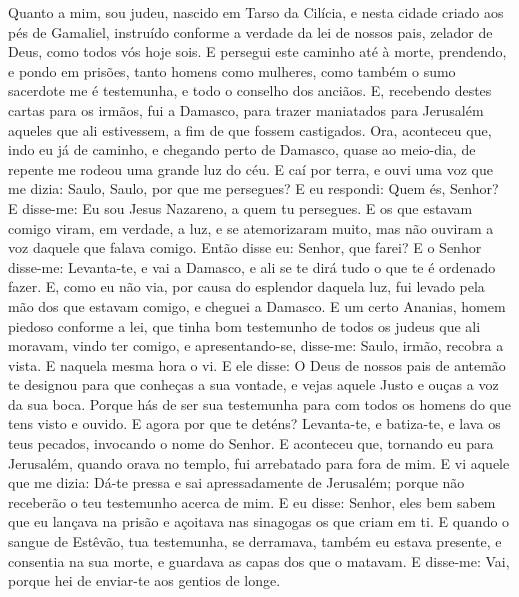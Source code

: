 Quanto a mim, sou judeu, nascido em Tarso da Cilícia, e nesta
cidade criado aos pés de Gamaliel, instruído conforme a verdade da
lei de nossos pais, zelador de Deus, como todos vós hoje sois. E
persegui este caminho até à morte, prendendo, e pondo em prisões,
tanto homens como mulheres, como também o sumo sacerdote me é
testemunha, e todo o conselho dos anciãos. E, recebendo destes
cartas para os irmãos, fui a Damasco, para trazer maniatados para
Jerusalém aqueles que ali estivessem, a fim de que fossem
castigados. Ora, aconteceu que, indo eu já de caminho, e
chegando perto de Damasco, quase ao meio-dia, de repente me rodeou
uma grande luz do céu. E caí por terra, e ouvi uma voz que me
dizia: Saulo, Saulo, por que me persegues? E eu respondi: Quem
és, Senhor? E disse-me: Eu sou Jesus Nazareno, a quem tu persegues.
E os que estavam comigo viram, em verdade, a luz, e se
atemorizaram muito, mas não ouviram a voz daquele que falava comigo.
Então disse eu: Senhor, que farei? E o Senhor disse-me:
Levanta-te, e vai a Damasco, e ali se te dirá tudo o que te é
ordenado fazer. E, como eu não via, por causa do esplendor
daquela luz, fui levado pela mão dos que estavam comigo, e cheguei a
Damasco. E um certo Ananias, homem piedoso conforme a lei,
que tinha bom testemunho de todos os judeus que ali moravam,
vindo ter comigo, e apresentando-se, disse-me: Saulo, irmão,
recobra a vista. E naquela mesma hora o vi. E ele disse: O
Deus de nossos pais de antemão te designou para que conheças a sua
vontade, e vejas aquele Justo e ouças a voz da sua boca.
Porque hás de ser sua testemunha para com todos os homens do
que tens visto e ouvido. E agora por que te deténs?
Levanta-te, e batiza-te, e lava os teus pecados, invocando o nome do
Senhor. E aconteceu que, tornando eu para Jerusalém, quando
orava no templo, fui arrebatado para fora de mim. E vi aquele
que me dizia: Dá-te pressa e sai apressadamente de Jerusalém; porque
não receberão o teu testemunho acerca de mim. E eu disse:
Senhor, eles bem sabem que eu lançava na prisão e açoitava nas
sinagogas os que criam em ti. E quando o sangue de Estêvão,
tua testemunha, se derramava, também eu estava presente, e consentia
na sua morte, e guardava as capas dos que o matavam. E
disse-me: Vai, porque hei de enviar-te aos gentios de longe.

